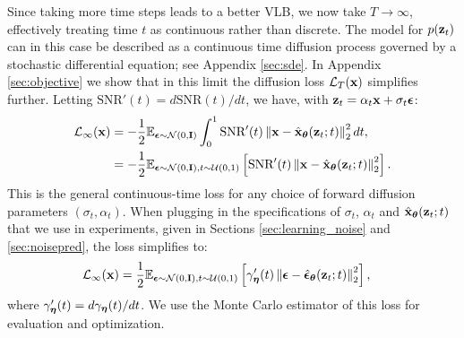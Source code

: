 \documentclass{article}
\newcommand{\lT}{\mathcal{L}_T(\rvx)}
\newcommand{\linfty}{\mathcal{L}_{\infty}(\rvx)}
\newcommand{\snr}{\text{SNR}}
\begin{document}
Since taking more time steps leads to a better VLB, we now take $T\rightarrow\infty$, effectively treating time $t$ as continuous rather than discrete. The model for $p({\mathbf{z}}_t)$ can in this case be described as a continuous time diffusion process \citep{song2020score} governed by a stochastic differential equation; see Appendix \ref{sec:sde}. In Appendix \ref{sec:objective} we show that in this limit the diffusion loss $\lT$ simplifies further. Letting $\snr'(t) = d \snr(t)/dt$, we have, with ${\mathbf{z}}_t = \alpha_t {\mathbf{x}} + \sigma_t {\boldsymbol{\epsilon}}$:
\begin{align}
\linfty
&= -\frac{1}{2}\E_{\bepsilon\sim\mathcal{N}(0,\bfI)} \int_{0}^{1} \snr'(t) \left\rVert \rvx - \hat{\rvx}_{\bT}(\rvz_t;t) \right\lVert_{2}^{2} dt, \label{eq:fusion_integral}
\\
&= -\frac{1}{2}\E_{\bepsilon\sim\mathcal{N}(0,\bfI), t \sim \mathcal{U}(0,1)}
\left[ \snr'(t) \left\rVert \rvx - \hat{\rvx}_{\bT}(\rvz_t;t) \right\lVert_{2}^{2} \right].
\label{eq:fusion}\end{align}
This is the general continuous-time loss for any choice of forward diffusion parameters $(\sigma_t,  \alpha_t)$. When plugging in the specifications of $\sigma_t$, $\alpha_t$ and $\hat{{\mathbf{x}}}_{{\boldsymbol{\theta}}}({\mathbf{z}}_t; t)$ that we use in experiments, given in Sections \ref{sec:learning_noise} and \ref{sec:noisepred}, the loss simplifies to:
\begin{align}
\linfty
%
%
&= \frac{1}{2}\E_{\bepsilon\sim\mathcal{N}(0,\bfI), t \sim \mathcal{U}(0,1)}
\left[ \gamma'_{\boldeta}(t) \left\rVert \bepsilon - \hat{\bepsilon}_{\bT}(\rvz_t;t) \right\lVert_{2}^{2} \right],
\end{align}
where $\gamma'_{{\boldsymbol{\eta}}}(t) = d \gamma_{{\boldsymbol{\eta}}}(t)/dt$. We use the Monte Carlo estimator of this loss for evaluation and optimization.


%
%
%
%
%
%
%

%

%
\end{document}
